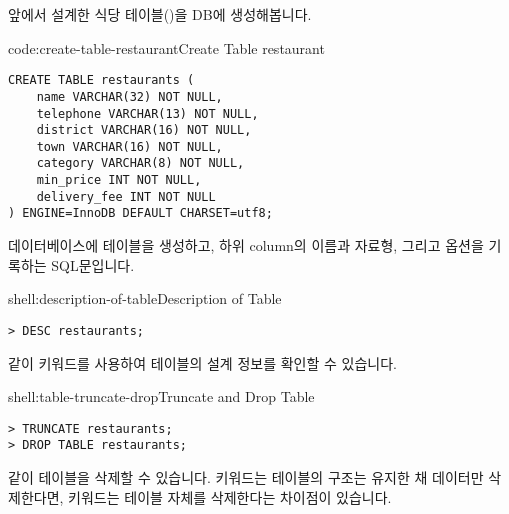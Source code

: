 앞에서 설계한 식당 테이블()을 DB에 생성해봅니다.

\begin{codeenv}{code:create-table-restaurant}{Create Table restaurant}\begin{verbatim}
CREATE TABLE restaurants (
    name VARCHAR(32) NOT NULL,
    telephone VARCHAR(13) NOT NULL,
    district VARCHAR(16) NOT NULL,
    town VARCHAR(16) NOT NULL,
    category VARCHAR(8) NOT NULL,
    min_price INT NOT NULL,
    delivery_fee INT NOT NULL
) ENGINE=InnoDB DEFAULT CHARSET=utf8;
\end{verbatim}
\end{codeenv}

\는 데이터베이스에  테이블을 생성하고, 하위 column의 이름과 자료형, 그리고 옵션을 기록하는 SQL문입니다.

\begin{shellenv}{shell:description-of-table}{Description of Table}\begin{verbatim}
> DESC restaurants;
\end{verbatim}
\end{shellenv}

\과 같이  키워드를 사용하여 테이블의 설계 정보를 확인할 수 있습니다.

\begin{shellenv}{shell:table-truncate-drop}{Truncate and Drop Table}\begin{verbatim}
> TRUNCATE restaurants;
> DROP TABLE restaurants;
\end{verbatim}
\end{shellenv}

\과 같이 테이블을 삭제할 수 있습니다.  키워드는 테이블의 구조는 유지한 채 데이터만 삭제한다면,  키워드는 테이블 자체를 삭제한다는 차이점이 있습니다.
